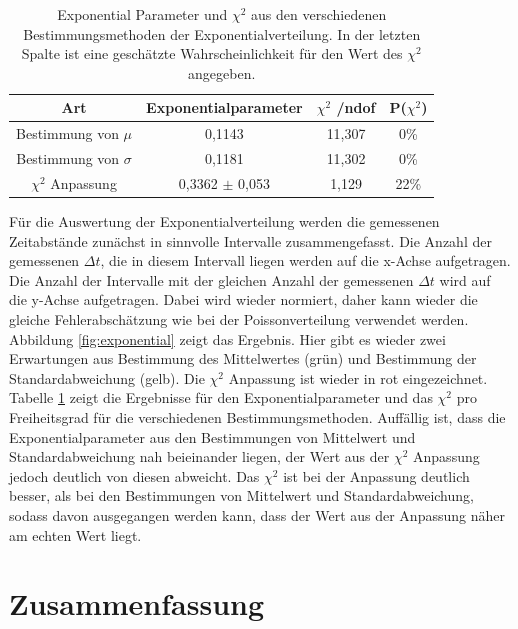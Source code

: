 \documentclass[12pt,a4paper]{article}
\begin{document}
\begin{table}
\centering
\begin{tabular}{|c|c|c|c|}
\hline 
Art & Exponentialparameter & $\chi ^2$ /ndof & P($\chi ^2$) \\ 
\hline 
Bestimmung von $\mu$ & 0,1143 & 11,307 & 0\% \\ 
\hline 
Bestimmung von $\sigma$ & 0,1181 & 11,302 & 0\% \\ 
\hline 
$\chi ^2$ Anpassung & 0,3362 $\pm$ 0,053 & 1,129 & 22\% \\ 
\hline 
\end{tabular} 
\caption{Exponential Parameter und $\chi ^2$ aus den verschiedenen Bestimmungsmethoden der Exponentialverteilung. In der letzten Spalte ist eine geschätzte Wahrscheinlichkeit für den Wert des $\chi ^2$ angegeben.}
\label{tab:Exponential}
\end{table}

Für die Auswertung der Exponentialverteilung werden die gemessenen Zeitabstände zunächst in sinnvolle Intervalle zusammengefasst. Die Anzahl der gemessenen $\Delta t$, die in diesem Intervall liegen werden auf die x-Achse aufgetragen. Die Anzahl der Intervalle mit der gleichen Anzahl der gemessenen $\Delta t$ wird auf die y-Achse aufgetragen. Dabei wird wieder normiert, daher kann wieder die gleiche Fehlerabschätzung wie bei der Poissonverteilung verwendet werden. Abbildung \ref{fig:exponential} zeigt das Ergebnis. Hier gibt es wieder zwei Erwartungen aus Bestimmung des Mittelwertes (grün) und Bestimmung der Standardabweichung (gelb). Die $\chi ^2$ Anpassung ist wieder in rot eingezeichnet.\\
Tabelle \ref{tab:Exponential} zeigt die Ergebnisse für den Exponentialparameter und das $\chi ^2$ pro Freiheitsgrad für die verschiedenen Bestimmungsmethoden. Auffällig ist, dass die Exponentialparameter aus den Bestimmungen von Mittelwert und Standardabweichung nah beieinander liegen, der Wert aus der $\chi ^2$ Anpassung jedoch deutlich von diesen abweicht. Das $\chi ^2$ ist bei der Anpassung deutlich besser, als bei den Bestimmungen von Mittelwert und Standardabweichung, sodass davon ausgegangen werden kann, dass der Wert aus der Anpassung näher am echten Wert liegt.

\section{Zusammenfassung}




	
\end{document}
